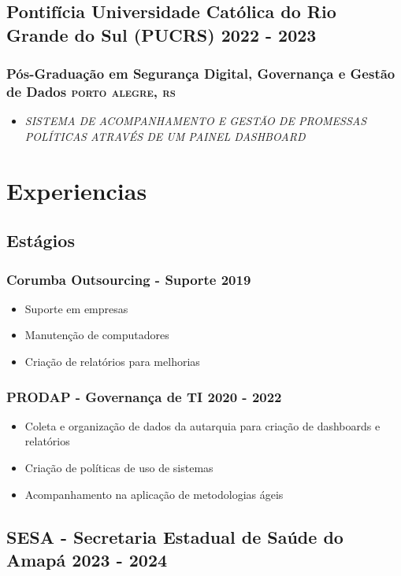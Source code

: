 \documentclass{article}
\newcommand{\rside}[1]{\hfill \normalfont\scshape\MakeLowercase{#1}}
\begin{document}
\subsection{Pontifícia Universidade Católica do Rio Grande do Sul (PUCRS) \rside{2022 - 2023}}
\subsubsection{Pós-Graduação em Segurança Digital, Governança e Gestão de Dados \rside{Porto Alegre, RS}}
\begin{itemize}
  \item \textit{SISTEMA DE ACOMPANHAMENTO E GESTÃO DE PROMESSAS POLÍTICAS ATRAVÉS DE UM PAINEL DASHBOARD}
\end{itemize}

\section{\faChartPie\enspace Experiencias}
\subsection{Estágios}
\subsubsection{Corumba Outsourcing - Suporte \rside{2019}}
\begin{itemize}
  \item Suporte em empresas
  \item Manutenção de computadores
  \item Criação de relatórios para melhorias
\end{itemize}
\subsubsection{PRODAP - Governança de TI \rside{2020 - 2022}}
\begin{itemize}
  \item Coleta e organização de dados da autarquia para criação de dashboards e relatórios
  \item Criação de políticas de uso de sistemas
  \item Acompanhamento na aplicação de metodologias ágeis
\end{itemize}

  
\subsection{SESA - Secretaria Estadual de Saúde do Amapá \rside{2023 - 2024}}
\end{document}
